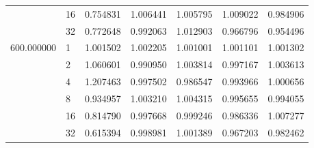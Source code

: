 \begin{tabular}{llrrrrr}
 & 16 & 0.754831 & 1.006441 & 1.005795 & 1.009022 & 0.984906 \\
 & 32 & 0.772648 & 0.992063 & 1.012903 & 0.966796 & 0.954496 \\
\multirow[c]{6}{*}{600.000000} & 1 & 1.001502 & 1.002205 & 1.001001 & 1.001101 & 1.001302 \\
 & 2 & 1.060601 & 0.990950 & 1.003814 & 0.997167 & 1.003613 \\
 & 4 & 1.207463 & 0.997502 & 0.986547 & 0.993966 & 1.000656 \\
 & 8 & 0.934957 & 1.003210 & 1.004315 & 0.995655 & 0.994055 \\
 & 16 & 0.814790 & 0.997668 & 0.999246 & 0.986336 & 1.007277 \\
 & 32 & 0.615394 & 0.998981 & 1.001389 & 0.967203 & 0.982462 \\
\end{tabular}
